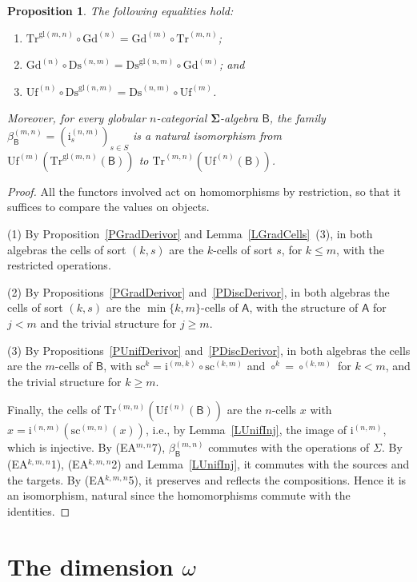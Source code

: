 \documentclass[a4paper,reqno]{amsart}
\newcommand{\sig}[1]{\mathbf{#1}}                %
\newcommand{\calg}[1]{\boldsymbol{\mathsf{#1}}}  %
\newcommand{\gl}{\mathrm{gl}}
\newcommand{\src}{\mathrm{sc}}
\newcommand{\ii}{\mathrm{i}}
\newcommand{\Gd}{\mathrm{Gd}}
\newcommand{\Uf}{\mathrm{Uf}}
\newcommand{\Ds}{\mathrm{Ds}}
\newcommand{\Tr}{\mathrm{Tr}}
\theoremstyle{plain}
\newtheorem{proposition}[theorem]{Proposition}
\theoremstyle{definition}
\begin{document}
\begin{proposition}\label{PCompatGdUf}
The following equalities hold:
\begin{enumerate}
\item $\Tr^{\gl(m,n)}\circ\Gd^{(n)}=\Gd^{(m)}\circ\Tr^{(m,n)}$;
\item $\Gd^{(n)}\circ\Ds^{(n,m)}=\Ds^{\gl(n,m)}\circ\Gd^{(m)}$; and
\item $\Uf^{(n)}\circ\Ds^{\gl(n,m)}=\Ds^{(n,m)}\circ\Uf^{(m)}$.
\end{enumerate}
Moreover, for every globular $n$-categorial $\sig{\Sigma}$-algebra $\calg{B}$, the family $\beta^{(m,n)}_{\calg{B}}=(\ii^{(n,m)}_{s})_{s\in S}$ is a natural isomorphism from $\Uf^{(m)}(\Tr^{\gl(m,n)}(\calg{B}))$ to $\Tr^{(m,n)}(\Uf^{(n)}(\calg{B}))$.
\end{proposition}
\begin{proof}
All the functors involved act on homomorphisms by restriction, so that it suffices to compare the values on objects.

(1) By Proposition~\ref{PGradDerivor} and Lemma~\ref{LGradCells}~(3), in both algebras the cells of sort $(k,s)$ are the $k$-cells of sort $s$, for $k\leq m$, with the restricted operations.

(2) By Propositions~\ref{PGradDerivor} and~\ref{PDiscDerivor}, in both algebras the cells of sort $(k,s)$ are the $\min\{k,m\}$-cells of $\calg{A}$, with the structure of $\calg{A}$ for $j<m$ and the trivial structure for $j\geq m$.

(3) By Propositions~\ref{PUnifDerivor} and~\ref{PDiscDerivor}, in both algebras the cells are the $m$-cells of $\calg{B}$, with $\src^{k}=\ii^{(m,k)}\circ\src^{(k,m)}$ and $\circ^{k}=\circ^{(k,m)}$ for $k<m$, and the trivial structure for $k\geq m$.

Finally, the cells of $\Tr^{(m,n)}(\Uf^{(n)}(\calg{B}))$ are the $n$-cells $x$ with $x=\ii^{(n,m)}(\src^{(m,n)}(x))$, i.e., by Lemma~\ref{LUnifInj}, the image of $\ii^{(n,m)}$, which is injective.
By (EA$^{m,n}$7), $\beta^{(m,n)}_{\calg{B}}$ commutes with the operations of $\Sigma$.
By (EA$^{k,m,n}$1), (EA$^{k,m,n}$2) and Lemma~\ref{LUnifInj}, it commutes with the sources and the targets.
By (EA$^{k,m,n}$5), it preserves and reflects the compositions.
Hence it is an isomorphism, natural since the homomorphisms commute with the identities.
\end{proof}

\section{The dimension \texorpdfstring{$\omega$}{omega}}\label{SOmega}
\end{document}
